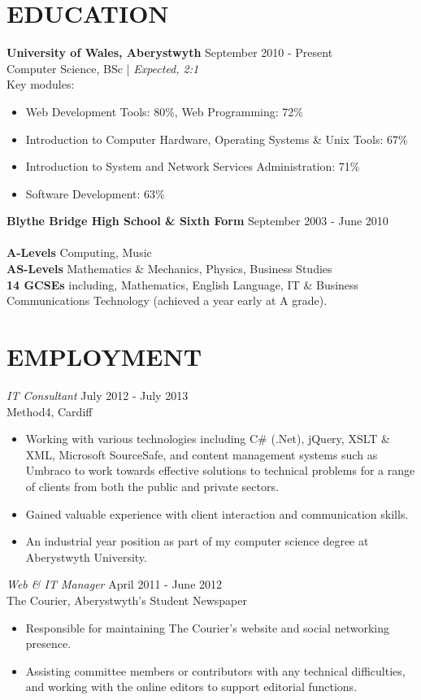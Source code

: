 \documentclass[line,margin]{res}
\begin{document}
\begin{resume}
\section{EDUCATION} {\bf University of Wales, Aberystwyth} \hfill September 2010 - Present\\
               Computer Science, BSc | {\sl Expected, 2:1}\\
Key modules: 
\begin{itemize} \itemsep -2pt
\item Web Development Tools: 80\%, Web Programming: 72\%
\item Introduction to Computer Hardware, Operating Systems \& Unix Tools: 67\%
\item Introduction to System and Network Services Administration: 71\%
\item Software Development: 63\%\\
\end{itemize}
{\bf Blythe Bridge High School \& Sixth Form} \hfill September 2003 - June 2010 \\ \\
{\bf A-Levels} Computing, Music\\
{\bf AS-Levels} Mathematics \& Mechanics, Physics, Business Studies\\
{\bf 14 GCSEs} including, Mathematics, English Language, IT \& Business Communications Technology (achieved a year early at A grade).

\newpage
\section{EMPLOYMENT}
	{\sl IT Consultant} \hfill July 2012 - July 2013 \\
	Method4, Cardiff
	\begin{itemize} \itemsep -2pt
		\item Working with various technologies including C\# (.Net), jQuery, XSLT \& XML, Microsoft SourceSafe, and content management systems such as Umbraco to work towards effective solutions to technical problems for a range of clients from both the public and private sectors.
		\item Gained valuable experience with client interaction and communication skills.
		\item An industrial year position as part of my computer science degree at Aberystwyth University.
	\end{itemize}

	{\sl Web \& IT Manager} \hfill April 2011 - June 2012 \\
	The Courier, Aberystwyth's Student Newspaper
	\begin{itemize} \itemsep -2pt
	\item Responsible for maintaining The Courier's website and social networking presence.
	\item Assisting committee members or contributors with any technical difficulties, and working with the online editors to support editorial functions.
	\end{itemize}


\end{resume}
\end{document}
